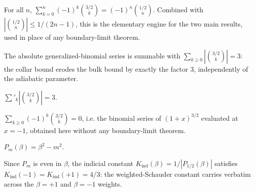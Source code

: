 \begin{lemma}\label{lem:collar_telescope}
    \leanok
    For all $n$, $\sum_{k=0}^{n} (-1)^k \binom{3/2}{k} = (-1)^n \binom{1/2}{n}$.
    Combined with $|\binom{1/2}{n}| \leq 1/(2n-1)$, this is the elementary engine
    for the two main results, used in place of any boundary-limit theorem.
\end{lemma}

\begin{theorem}[Absolute re-summation $\sum |\binom{3/2}{k}| = 3$]\label{thm:collar_resum}
    \leanok
    The absolute generalized-binomial series is summable with
    $\sum_{k \geq 0} |\binom{3/2}{k}| = 3$: the collar bound erodes the bulk bound
    by exactly the factor $3$, independently of the adiabatic parameter.
\end{theorem}

\begin{theorem}\label{thm:tsum_C32}
    \leanok
    $\sum'_{k} |\binom{3/2}{k}| = 3$.
\end{theorem}

\begin{theorem}\label{thm:alt_binomial}
    \leanok
    $\sum_{k \geq 0} (-1)^k \binom{3/2}{k} = 0$, i.e. the binomial series of
    $(1+x)^{3/2}$ evaluated at $x = -1$, obtained here without any boundary-limit
    theorem.
\end{theorem}

\begin{definition}\label{def:Pind}
    \leanok
    $P_m(\beta) = \beta^2 - m^2$.
\end{definition}

\begin{theorem}[Indicial parity $K_{\mathrm{ind}}(-1) = K_{\mathrm{ind}}(+1) = 4/3$]\label{thm:indicial_parity}
    \leanok
    Since $P_m$ is even in $\beta$, the indicial constant
    $K_{\mathrm{ind}}(\beta) = 1/|P_{1/2}(\beta)|$ satisfies
    $K_{\mathrm{ind}}(-1) = K_{\mathrm{ind}}(+1) = 4/3$: the weighted-Schauder
    constant carries verbatim across the $\beta = +1$ and $\beta = -1$ weights.
\end{theorem}

